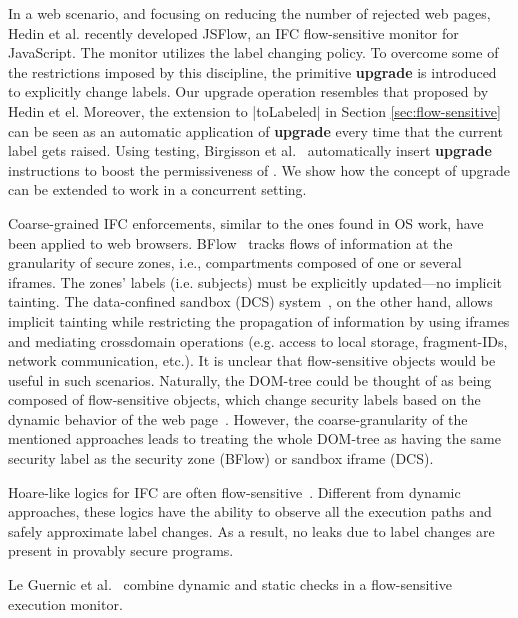 In a web scenario, and focusing on reducing the number of rejected web pages,
Hedin et al. \citep{Hedin13} recently developed JSFlow, an IFC flow-sensitive
monitor for JavaScript. The monitor utilizes the {\nsu} label changing
policy. To overcome some of the restrictions imposed by this discipline, the
primitive \textbf{upgrade} is introduced to explicitly change labels. Our
upgrade operation resembles that proposed by Hedin et el. Moreover, the
extension to |toLabeled| in Section \ref{sec:flow-sensitive} can be seen as an
automatic application of \textbf{upgrade} every time that the current label gets
raised. Using testing, Birgisson et al.~\citep{Arnar2012} automatically insert
\textbf{upgrade} instructions to boost the permissiveness of {\nsu}. We show how
the concept of upgrade can be extended to work in a concurrent setting.



Coarse-grained IFC enforcements, similar to the ones found in OS work, have been
applied to web browsers. BFlow~\citep{Yip:2009} tracks flows of information at
the granularity of secure zones, i.e., compartments composed of one or several
iframes. The zones' labels (i.e. subjects) must be explicitly updated---no
implicit tainting. The data-confined sandbox (DCS)
system~\citep{conf/esorics/AkhaweLHSS13}, on the other hand, allows implicit
tainting while restricting the propagation of information by using iframes and
mediating crossdomain operations (e.g. access to local storage, fragment-IDs,
network communication, etc.). It is unclear that flow-sensitive objects would be
useful in such scenarios. Naturally, the DOM-tree could be thought of as being
composed of flow-sensitive objects, which change security labels based on the
dynamic behavior of the web page~\citep{Russo:2009}. However, the
coarse-granularity of the mentioned approaches leads to treating the whole DOM-tree
as having the same security label as the security zone (BFlow) or sandbox iframe
(DCS). 

Hoare-like logics for IFC are often
flow-sensitive~\citep[e.g.][]{Amtoft:2006,Nanevski:2011}. Different from dynamic
approaches, these logics have the ability to observe all the execution paths and
safely approximate label changes. As a result, no leaks due to label changes are
present in provably secure programs.


Le Guernic et al.~\citep{LeGuernic:2006,Guernic:2007:ACM} combine dynamic and
static checks in a flow-sensitive execution monitor.
 




